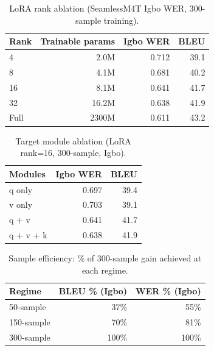 
\begin{table}[t]
\centering
\small
\caption{LoRA rank ablation (SeamlessM4T Igbo WER, 300-sample training).}
\label{tab:lora_rank_ablation}
\begin{tabular}{lrrr}
\toprule
\textbf{Rank} & \textbf{Trainable params} & \textbf{Igbo WER} & \textbf{BLEU} \\
\midrule
4   & 2.0M & 0.712 & 39.1 \\
8   & 4.1M & 0.681 & 40.2 \\
16  & 8.1M & 0.641 & 41.7 \\
32  & 16.2M & 0.638 & 41.9 \\
Full & 2300M & 0.611 & 43.2 \\
\bottomrule
\end{tabular}
\end{table}

\begin{table}[t]
\centering
\small
\caption{Target module ablation (LoRA rank=16, 300-sample, Igbo).}
\label{tab:target_module_ablation}
\begin{tabular}{lrr}
\toprule
\textbf{Modules} & \textbf{Igbo WER} & \textbf{BLEU} \\
\midrule
q only     & 0.697 & 39.4 \\
v only     & 0.703 & 39.1 \\
q + v      & 0.641 & 41.7 \\
q + v + k  & 0.638 & 41.9 \\
\bottomrule
\end{tabular}
\end{table}

\begin{table}[t]
\centering
\small
\caption{Sample efficiency: \% of 300-sample gain achieved at each regime.}
\label{tab:sample_efficiency}
\begin{tabular}{lrr}
\toprule
\textbf{Regime} & \textbf{BLEU \% (Igbo)} & \textbf{WER \% (Igbo)} \\
\midrule
50-sample  & 37\% & 55\% \\
150-sample & 70\% & 81\% \\
300-sample & 100\% & 100\% \\
\bottomrule
\end{tabular}
\end{table}
